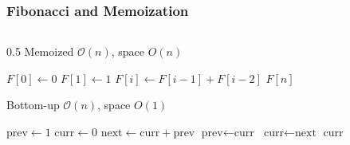 \documentclass{beamer}
\begin{document}
\begin{frame}
    \frametitle{Fibonacci and Memoization}
    \scriptsize %
    
    \begin{columns}[T] %
        \begin{column}{0.5\textwidth}
            \scriptsize
            Memoized $\mathcal{O}(n)$, space $O(n)$
            \begin{algorithmic}[1]
                    \State $F[0] \gets 0$
                    \State $F[1] \gets 1$
                        \State $F[i] \gets F[i-1] + F[i-2]$
                    \EndFor
                    \State \Return $F[n]$
                \EndFunction
            \end{algorithmic}
            
            \vspace{0.5em}
            Bottom-up $\mathcal{O}(n)$, space $O(1)$
            \begin{algorithmic}[1]
                    \State $\text{prev} \gets 1$
                    \State $\text{curr} \gets 0$
                        \State $\text{next} \gets \text{curr} + \text{prev}$
                        \State $\text{prev} \gets \text{curr}$
                        \State $\text{curr} \gets \text{next}$
                    \EndFor
                    \State \Return $\text{curr}$
                \EndFunction
            \end{algorithmic}
        \end{column}


\end{columns}
\end{frame}
\end{document}
